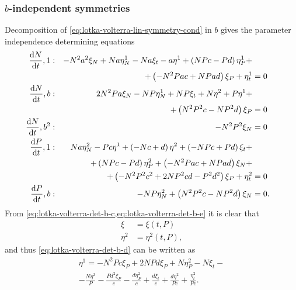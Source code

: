 \subsubsection{\texorpdfstring{\(b\)-independent symmetries}{b-independent symmetries}}

Decomposition of \cref{eq:lotka-volterra-lin-symmetry-cond} in \(b\) gives the parameter independence determining equations
\begin{subequations}\label{eq:lotka-volterra-det-b}
  \begin{flalign}
    \diff{N}{t}, 1 & : & - N^{2} a^{2} \xi_{N} + N a \eta^1_{N} - N a \xi_{t} - a \eta^{1} + \left(N P c - P d\right) \eta^1_{P} +&&\\&&+ \left(- N^{2} P a c + N P a d\right) \xi_{P} + \eta^1_{t} &= 0 &\label{eq:lotka-volterra-det-b-a}\\
    \diff{N}{t}, b & : & 2 N^{2} P a \xi_{N} - N P \eta^1_{N} + N P \xi_{t} + N \eta^{2} + P \eta^{1} +&&\\&&+ \left(N^{2} P^{2} c - N P^{2} d\right) \xi_{P} &= 0 &\label{eq:lotka-volterra-det-b-b}\\
    \diff{N}{t}, b^2 & : & - N^{2} P^{2} \xi_{N} &= 0 &\label{eq:lotka-volterra-det-b-c}\\
    \diff{P}{t}, 1 & : & N a \eta^2_{N} - P c \eta^{1} + \left(- N c + d\right) \eta^{2} + \left(- N P c + P d\right) \xi_{t} +&&\\&&+ \left(N P c - P d\right) \eta^2_{P} + \left(- N^{2} P a c + N P a d\right) \xi_{N} +&&\\&&+ \left(- N^{2} P^{2} c^{2} + 2 N P^{2} c d - P^{2} d^{2}\right) \xi_{P} + \eta^2_{t} &= 0 &\label{eq:lotka-volterra-det-b-d}\\
    \diff{P}{t}, b & : & - N P \eta^2_{N} + \left(N^{2} P^{2} c - N P^{2} d\right) \xi_{N} &= 0. &\label{eq:lotka-volterra-det-b-e}
  \end{flalign}
\end{subequations}
From \cref{eq:lotka-volterra-det-b-c,eq:lotka-volterra-det-b-e} it is clear that
\begin{subequations} \label{eq:lotka-volterra-b-first-simplification}
  \begin{align}
    \xi &= \xi(t, P) \\
    \eta^2 &= \eta^2(t, P),
  \end{align}
\end{subequations}
and thus \cref{eq:lotka-volterra-det-b-d} can be written as
\begin{multline*}
  \eta^{1} = - N^{2} P c \xi_{P} + 2 N P d \xi_{P} + N \eta^2_{P} - N \xi_{t} -\\- \frac{N \eta^{2}}{P} - \frac{P d^{2} \xi_{P}}{c} - \frac{d \eta^2_{P}}{c} + \frac{d \xi_{t}}{c} + \frac{d \eta^{2}}{P c} + \frac{\eta^2_{t}}{P c}.
\end{multline*}
